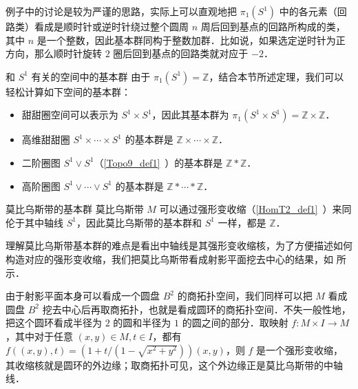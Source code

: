例子中的讨论是较为严谨的思路，实际上可以直观地把 $\pi_1(S^1)$ 中的各元素（回路类）看成是顺时针或逆时针绕过整个圆周 $n$ 周后回到基点的回路所构成的类，其中 $n$ 是一个整数，因此基本群同构于整数加群．比如说，如果选定逆时针为正方向，那么顺时针旋转 $2$ 圈后回到基点的回路类就对应于 $-2$．


\begin{example}{和 $S^1$ 有关的空间中的基本群}
由于 $\pi_1(S^1)=\mathbb{Z}$，结合本节所述定理，我们可以轻松计算如下空间的基本群：
\begin{itemize}
\item 甜甜圈空间可以表示为 $S^1\times S^1$，因此其基本群为 $\pi_1(S^1\times S^1)=\mathbb{Z}\times\mathbb{Z}$．
\item 高维甜甜圈 $S^1\times\cdots\times S^1$ 的基本群是 $\mathbb{Z}\times\cdots\times\mathbb{Z}$．
\item 二阶圈图 $S^1\vee S^1$（\autoref{Topo9_def1}~）的基本群是 $\mathbb{Z}*\mathbb{Z}$．
\item 高阶圈图 $S^1\vee\cdots\vee S^1$ 的基本群是 $\mathbb{Z}*\cdots*\mathbb{Z}$．
\end{itemize}

\end{example}

\begin{example}{莫比乌斯带的基本群}\label{HomT5_ex1}
莫比乌斯带 $M$ 可以通过强形变收缩（\autoref{HomT2_def1}~）来同伦于其中轴线 $S^1$，因此莫比乌斯带的基本群和 $S^1$ 一样，都是 $\mathbb{Z}$．

理解莫比乌斯带基本群的难点是看出中轴线是其强形变收缩核，为了方便描述如何构造对应的强形变收缩，我们把莫比乌斯带看成射影平面挖去中心的结果，如%
所示．


由于射影平面本身可以看成一个圆盘 $B^2$ 的商拓扑空间，我们同样可以把 $M$ 看成圆盘 $B^2$ 挖去中心后再取商拓扑，也就是看成圆环的商拓扑空间．不失一般性地，把这个圆环看成半径为 $2$ 的圆和半径为 $1$ 的圆之间的部分．取映射 $f:M\times I\rightarrow M$，其中对于任意 $(x, y)\in M, t\in I$，都有 $f((x, y), t)= (1+t/(1-\sqrt{x^2+y^2}))(x, y)$，则 $f$ 是一个强形变收缩，其收缩核就是圆环的外边缘；取商拓扑可见，这个外边缘正是莫比乌斯带的中轴线．
\end{example}

